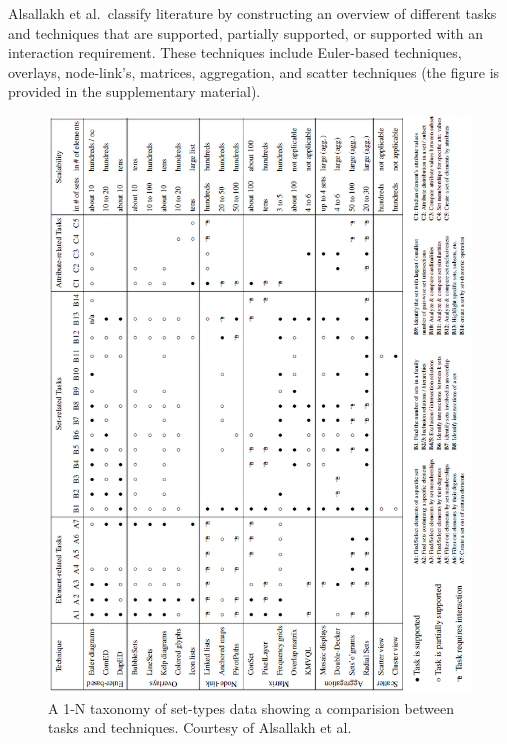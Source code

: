 Alsallakh et al.\ classify literature by constructing an overview of different tasks and techniques that are supported, partially supported, or supported with an interaction requirement. These techniques include Euler-based techniques, overlays, node-link's, matrices, aggregation, and scatter techniques (the figure is provided in the supplementary material).

\begin{figure}[p]
\begin{center}
\includegraphics[width=1\textwidth]{images/alsallakh2014visualising}
\caption{A 1-N taxonomy of set-types data showing a comparision between tasks and techniques. Courtesy of Alsallakh et al.\ \cite{alsallakh2014visualising}} \label{fig: alsallakh2014visualising}
\end{center}
\end{figure}

